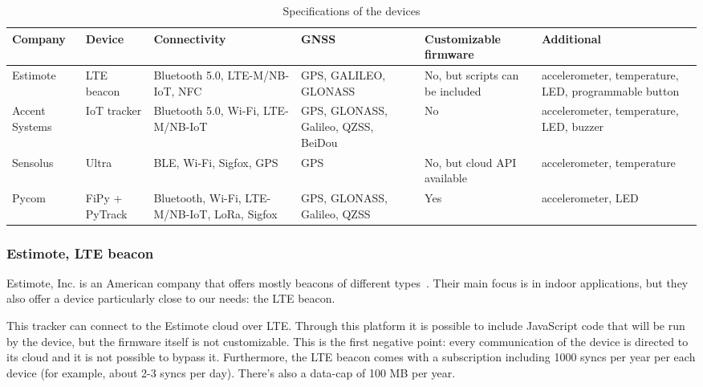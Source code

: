 \begin{table}[htbp]
\centering
{}
\begin{tabularx}{\textwidth}{YYYYYY}
\toprule
\textbf{Company}        & \textbf{Device}         & \textbf{Connectivity}                                                          & \textbf{GNSS}                                & \textbf{Customizable firmware}           & \textbf{Additional}                                           \\ \midrule
Estimote       & LTE beacon     & Bluetooth 5.0, LTE-M/NB-IoT, NFC                                      & GPS, GALILEO, GLONASS               & No, but scripts can be included & accelerometer, temperature, LED, programmable button \\ \midrule
Accent Systems & IoT tracker    & Bluetooth 5.0, Wi-Fi, LTE-M/NB-IoT                                    & GPS, GLONASS, Galileo, QZSS, BeiDou & No                              & accelerometer, temperature, LED, buzzer              \\ \midrule
Sensolus       & Ultra          & BLE, Wi-Fi, Sigfox, GPS                                               & GPS                                 & No, but cloud API available     & accelerometer, temperature                           \\ \midrule
Pycom          & FiPy + PyTrack & Bluetooth, Wi-Fi, LTE-M/NB-IoT, LoRa, Sigfox & GPS, GLONASS, Galileo, QZSS         & Yes                             & accelerometer, LED                                   \\ \bottomrule
\end{tabularx}
\caption{Specifications of the devices}
\label{table_devices}
\end{table}

\subsubsection{Estimote, LTE beacon}
Estimote, Inc. is an American company that offers mostly beacons of different types~\cite{estimote}. Their main focus is in indoor applications, but they also offer a device particularly close to our needs: the LTE beacon.

This tracker can connect to the Estimote cloud over LTE. Through this platform it is possible to include JavaScript code that will be run by the device, but the firmware itself is not customizable. This is the first negative point: every communication of the device is directed to its cloud and it is not possible to bypass it. Furthermore, the LTE beacon comes with a subscription including 1000 syncs per year per each device (for example, about 2-3 syncs per day). There’s also a data-cap of 100 MB per year.

